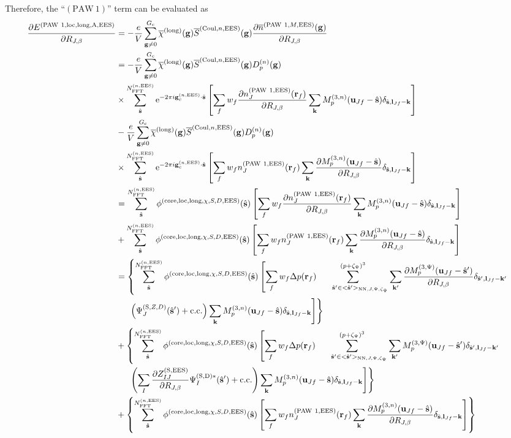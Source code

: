 \documentclass[paper=a4, fontsize=11pt]{article} %
\numberwithin{equation}{section} %
\numberwithin{figure}{section} %
\numberwithin{table}{section} %
\newcommand{\p}{\partial}
\newcommand{\ol}{\overline}
\newcommand{\bu}{{\bf{u}}}
\newcommand{\bl}{{\bf{l}}}
\newcommand{\bk}{{\bf{k}}}
\newcommand{\bs}{{\bf{s}}}
\newcommand{\bg}{{\bf{g}}}
\newcommand{\br}{{\bf{r}}}
\newcommand{\hs}{{\hat{\bf{s}}}}
\newcommand{\rS}{{\mathrm{S}}}
\newcommand{\rEES}{{\mathrm{EES}}}
\newcommand{\rcore}{{\mathrm{core}}}
\newcommand{\rNN}{{\mathrm{NN}}}
\newcommand{\re}{{\mathrm{e}}}
\newcommand{\rCo}{{\mathrm{Coul}}}
\newcommand{\rcc}{{\mathrm{c.c.}}}
\newcommand{\rlong}{{\mathrm{long}}}
\newcommand{\rP}{{\mathrm{PAW}}}
\newcommand{\rA}{{\mathrm{A}}}
\newcommand{\rD}{{\mathrm{D}}}
\newcommand{\rlo}{{\mathrm{loc}}}
\newcommand{\gcnEES}{{\bg_c^{(n,\rEES)}}}
\newcommand{\RJb}{{R_{J,\beta}}}
\newcommand{\NFFTnEES}{{N^{(n,\rEES)}_{\mathrm{FFT}}}}
\newcommand{\Gc}{{G_{\mathrm{c}}}}
\newcommand{\Mn}{{M_p^{(3,n)}}}
\newcommand{\Mp}{{M_p^{(3,\Psi)}}}
\newcommand{\pzp}{{(p+\zeta_{\Psi})^3}}
\newcommand{\hspJp}{{<\hs'>_{\rNN,J,\Psi,\zeta_\Psi}}}
\newcommand{\hspinJp}{{\ \ \ \ \ \hs'  \in  \hspJp}}
\begin{document}
Therefore, the ``$(\rP\ 1)$'' term can be evaluated as
\begin{equation}
\begin{split}
\frac{\p E^{(\rP\ 1,\rlo,\rlong,\rA,\rEES)}}{\p \RJb}
&= -\frac{e}{V} \sum_{\bg \neq 0}^{\Gc} \ol \chi^{(\rlong)}(\bg) \ol S^{(\rCo,n,\rEES)}(\bg) \frac{\p \ol n^{(\rP\ 1,M,\rEES)}(\bg)}{\p \RJb}\\
&= -\frac{e}{V} \sum_{\bg \neq 0}^{\Gc} \ol \chi^{(\rlong)}(\bg) \ol S^{(\rCo,n,\rEES)}(\bg) D_p^{(n)}(\bg)\\
&\times \sum_{\hat \bs}^{\NFFTnEES} \re^{-2\pi i\gcnEES \cdot \hat\bs}\left[\sum_f w_f  \frac{\p n_J^{(\rP\ 1,\rEES)}(\br_f)}{\p \RJb} \sum_{\bk}  \Mn(\bu_{Jf}-\hat \bs)\delta_{\hat \bs,\bl_{Jf}-\bk}\right]\\
&-\frac{e}{V} \sum_{\bg \neq 0}^{\Gc} \ol \chi^{(\rlong)}(\bg) \ol S^{(\rCo,n,\rEES)}(\bg) D_p^{(n)}(\bg)\\
&\times \sum_{\hat \bs}^{\NFFTnEES} \re^{-2\pi i\gcnEES\cdot \hat\bs}\left[\sum_f w_f n_J^{(\rP\ 1,\rEES)}(\br_f) \sum_{\bk}  \frac{\p \Mn(\bu_{Jf}-\hat \bs)}{\p \RJb}\delta_{\hat \bs,\bl_{Jf}-\bk}\right]\\
&= \sum_{\hat \bs}^{\NFFTnEES} \phi^{(\rcore,\rlo,\rlong,\chi,S,D,\rEES)}(\hs) \left[\sum_f w_f  \frac{\p n_J^{(\rP\ 1,\rEES)}(\br_f)}{\p \RJb} \sum_{\bk}  \Mn(\bu_{Jf}-\hat \bs)\delta_{\hat \bs,\bl_{Jf}-\bk}\right] \\
&+ \sum_{\hat \bs}^{\NFFTnEES} \phi^{(\rcore,\rlo,\rlong,\chi,S,D,\rEES)}(\hs) \left[\sum_f w_f  n_J^{(\rP\ 1,\rEES)}(\br_f) \sum_{\bk}  \frac{\p \Mn(\bu_{Jf}-\hat \bs)}{\p \RJb}\delta_{\hat \bs,\bl_{Jf}-\bk}\right] \\
&= \left\{\sum_{\hat \bs}^{\NFFTnEES} \phi^{(\rcore,\rlo,\rlong,\chi,S,D,\rEES)}(\hs) \left[\sum_f w_f  \Delta p(\br_f)\sum_{\hspinJp}^{\pzp} \sum_{\bk'} \frac{\p \Mp(\bu_{Jf}-\hat \bs')}{\p \RJb}\delta_{\hat \bs',\bl_{Jf}-\bk'} \right. \right.\\ 
&\ \ \ \ \left. \left. \left(\Psi_J^{(\rS,Z,D)}(\hat \bs')+ \rcc\right) \sum_{\bk}  \Mn(\bu_{Jf}-\hat \bs)\delta_{\hat \bs,\bl_{Jf}-\bk}\right] \right\}\\
&+  \left\{\sum_{\hat \bs}^{\NFFTnEES} \phi^{(\rcore,\rlo,\rlong,\chi,S,D,\rEES)}(\hs) \left[\sum_f w_f  \Delta p(\br_f)\sum_{\hspinJp}^{\pzp} \sum_{\bk'} \Mp(\bu_{Jf}-\hat \bs')\delta_{\hat \bs',\bl_{Jf}-\bk'} \right. \right. \\ 
&\ \ \ \ \left. \left. \left(\sum_I \frac{\p Z_{IJ}^{(\rS,\rEES)}}{\p \RJb}\Psi_I^{(\rS,\rD)*}(\hat \bs')+ \rcc\right) \sum_{\bk}  \Mn(\bu_{Jf}-\hat \bs)\delta_{\hat \bs,\bl_{Jf}-\bk}\right] \right\}\\
&+ \left\{\sum_{\hat \bs}^{\NFFTnEES} \phi^{(\rcore,\rlo,\rlong,\chi,S,D,\rEES)}(\hs) \left[\sum_f w_f  n_J^{(\rP\ 1,\rEES)}(\br_f) \sum_{\bk}  \frac{\p \Mn(\bu_{Jf}-\hat \bs)}{\p \RJb}\delta_{\hat \bs,\bl_{Jf}-\bk}\right]\right\} \\
\end{split}
\end{equation}
\end{document}
